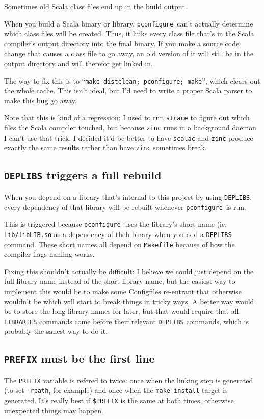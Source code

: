 \documentclass{article}
\newcommand{\pconfigure}{\texttt{pconfigure}}
\begin{document}
Sometimes old Scala class files end up in the build output.

When you build a Scala binary or library, \pconfigure\ can't actually
determine which class files will be created.  Thus, it links every
class file that's in the Scala compiler's output directory into the
final binary.  If you make a source code change that causes a class
file to go away, an old version of it will still be in the output
directory and will therefor get linked in.

The way to fix this is to ``\texttt{make distclean; pconfigure;
  make}'', which clears out the whole cache.  This isn't ideal, but
I'd need to write a proper Scala parser to make this bug go away.

Note that this is kind of a regression: I used to run \texttt{strace}
to figure out which files the Scala compiler touched, but because
\texttt{zinc} runs in a background daemon I can't use that trick.  I
decided it'd be better to have \texttt{scalac} and \texttt{zinc}
produce exactly the same results rather than have \texttt{zinc}
sometimes break.

\subsection{\texttt{DEPLIBS} triggers a full rebuild}

When you depend on a library that's internal to this project by using
\texttt{DEPLIBS}, every dependency of that library will be rebuilt
whenever \pconfigure\ is run.

This is triggered because \pconfigure\ uses the library's short name
(ie, \texttt{lib/libLIB.so} as a dependency of theh binary when you
add a \texttt{DEPLIBS} command.  These short names all depend on
\texttt{Makefile} because of how the compiler flags hanling works.

Fixing this shouldn't actually be difficult: I believe we could just
depend on the full library name instead of the short library name, but
the easiest way to implement this would be to make some Configfiles
re-entrant that otherwise wouldn't be which will start to break things
in tricky ways.  A better way would be to store the long library names
for later, but that would require that all \texttt{LIBRARIES} commands
come before their relevant \texttt{DEPLIBS} commands, which is
probably the sanest way to do it.

\subsection{\texttt{PREFIX} must be the first line \label{err::prefix}}

The \texttt{PREFIX} variable is refered to twice: once when the
linking step is generated (to set \texttt{-rpath}, for example) and
once when the \texttt{make install} target is generated.  It's really
best if \texttt{\$PREFIX} is the same at both times, otherwise
unexpected things may happen.
\end{document}
